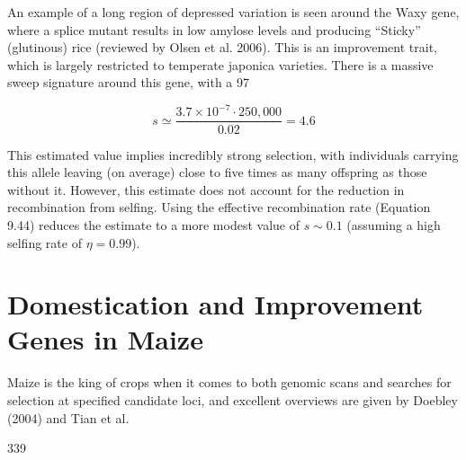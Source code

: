 \documentclass{article}
\begin{document}
An example of a long region of depressed variation is seen around the Waxy gene, where a splice mutant results in low amylose levels and producing “Sticky” (glutinous) rice (reviewed by Olsen et al. 2006). This is an improvement trait, which is largely restricted to temperate japonica varieties. There is a massive sweep signature around this gene, with a 97%

\begin{equation}
s\simeq\frac{3.7\times10^{-7}\cdot250,000}{0.02}=4.6
\end{equation}

This estimated value implies incredibly strong selection, with individuals carrying this allele leaving (on average) close to five times as many offspring as those without it. However, this estimate does not account for the reduction in recombination from selfing. Using the effective recombination rate (Equation 9.44) reduces the estimate to a more modest value of  $ s \sim 0.1 $ (assuming a high selfing rate of  $ \eta = 0.99 $).

\section{Domestication and Improvement Genes in Maize}
Maize is the king of crops when it comes to both genomic scans and searches for selection at specified candidate loci, and excellent overviews are given by Doebley (2004) and Tian et al.

339
\end{document}
